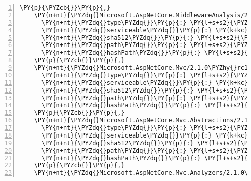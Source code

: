 \begin{Verbatim}[commandchars=\\\{\},numbers=left,firstnumber=1,stepnumber=1,numberblanklines=0]
    \PY{p}{\PYZcb{}}\PY{p}{,}
    \PY{n+nt}{\PYZdq{}Microsoft.AspNetCore.MiddlewareAnalysis/2.1.0\PYZhy{}rc1\PYZhy{}final\PYZdq{}}\PY{p}{:} \PY{p}{\PYZob{}}
      \PY{n+nt}{\PYZdq{}type\PYZdq{}}\PY{p}{:} \PY{l+s+s2}{\PYZdq{}package\PYZdq{}}\PY{p}{,}
      \PY{n+nt}{\PYZdq{}serviceable\PYZdq{}}\PY{p}{:} \PY{k+kc}{true}\PY{p}{,}
      \PY{n+nt}{\PYZdq{}sha512\PYZdq{}}\PY{p}{:} \PY{l+s+s2}{\PYZdq{}sha512\PYZhy{}tJcB2Gg28jD4fzJTsvRDHzqRAwuV+8PgzNV1Vmv711gmxodvrEgwdJBqNXQ25uB1SzfSIO/gHFbF5jERTpE89g==\PYZdq{}}\PY{p}{,}
      \PY{n+nt}{\PYZdq{}path\PYZdq{}}\PY{p}{:} \PY{l+s+s2}{\PYZdq{}microsoft.aspnetcore.middlewareanalysis/2.1.0\PYZhy{}rc1\PYZhy{}final\PYZdq{}}\PY{p}{,}
      \PY{n+nt}{\PYZdq{}hashPath\PYZdq{}}\PY{p}{:} \PY{l+s+s2}{\PYZdq{}microsoft.aspnetcore.middlewareanalysis.2.1.0\PYZhy{}rc1\PYZhy{}final.nupkg.sha512\PYZdq{}}
    \PY{p}{\PYZcb{}}\PY{p}{,}
    \PY{n+nt}{\PYZdq{}Microsoft.AspNetCore.Mvc/2.1.0\PYZhy{}rc1\PYZhy{}final\PYZdq{}}\PY{p}{:} \PY{p}{\PYZob{}}
      \PY{n+nt}{\PYZdq{}type\PYZdq{}}\PY{p}{:} \PY{l+s+s2}{\PYZdq{}package\PYZdq{}}\PY{p}{,}
      \PY{n+nt}{\PYZdq{}serviceable\PYZdq{}}\PY{p}{:} \PY{k+kc}{true}\PY{p}{,}
      \PY{n+nt}{\PYZdq{}sha512\PYZdq{}}\PY{p}{:} \PY{l+s+s2}{\PYZdq{}sha512\PYZhy{}wpUUEbxMpQc0ns/HERn4ulxQPtigreC/GPrv7UgxOteU8r1zlGL1SZt3rTPTR0gUs9K9jd0jDVNMvyQdiT03lw==\PYZdq{}}\PY{p}{,}
      \PY{n+nt}{\PYZdq{}path\PYZdq{}}\PY{p}{:} \PY{l+s+s2}{\PYZdq{}microsoft.aspnetcore.mvc/2.1.0\PYZhy{}rc1\PYZhy{}final\PYZdq{}}\PY{p}{,}
      \PY{n+nt}{\PYZdq{}hashPath\PYZdq{}}\PY{p}{:} \PY{l+s+s2}{\PYZdq{}microsoft.aspnetcore.mvc.2.1.0\PYZhy{}rc1\PYZhy{}final.nupkg.sha512\PYZdq{}}
    \PY{p}{\PYZcb{}}\PY{p}{,}
    \PY{n+nt}{\PYZdq{}Microsoft.AspNetCore.Mvc.Abstractions/2.1.0\PYZhy{}rc1\PYZhy{}final\PYZdq{}}\PY{p}{:} \PY{p}{\PYZob{}}
      \PY{n+nt}{\PYZdq{}type\PYZdq{}}\PY{p}{:} \PY{l+s+s2}{\PYZdq{}package\PYZdq{}}\PY{p}{,}
      \PY{n+nt}{\PYZdq{}serviceable\PYZdq{}}\PY{p}{:} \PY{k+kc}{true}\PY{p}{,}
      \PY{n+nt}{\PYZdq{}sha512\PYZdq{}}\PY{p}{:} \PY{l+s+s2}{\PYZdq{}sha512\PYZhy{}Vfh6GCN06g0+edyxAyPkVQelugN0583M002yleWCYQcu/xPXzEqXeu/F1Mqc9PSISXJrrLxD+nYTFEP37Celbg==\PYZdq{}}\PY{p}{,}
      \PY{n+nt}{\PYZdq{}path\PYZdq{}}\PY{p}{:} \PY{l+s+s2}{\PYZdq{}microsoft.aspnetcore.mvc.abstractions/2.1.0\PYZhy{}rc1\PYZhy{}final\PYZdq{}}\PY{p}{,}
      \PY{n+nt}{\PYZdq{}hashPath\PYZdq{}}\PY{p}{:} \PY{l+s+s2}{\PYZdq{}microsoft.aspnetcore.mvc.abstractions.2.1.0\PYZhy{}rc1\PYZhy{}final.nupkg.sha512\PYZdq{}}
    \PY{p}{\PYZcb{}}\PY{p}{,}
    \PY{n+nt}{\PYZdq{}Microsoft.AspNetCore.Mvc.Analyzers/2.1.0\PYZhy{}rc1\PYZhy{}final\PYZdq{}}\PY{p}{:} \PY{p}{\PYZob{}}

\end{Verbatim}
